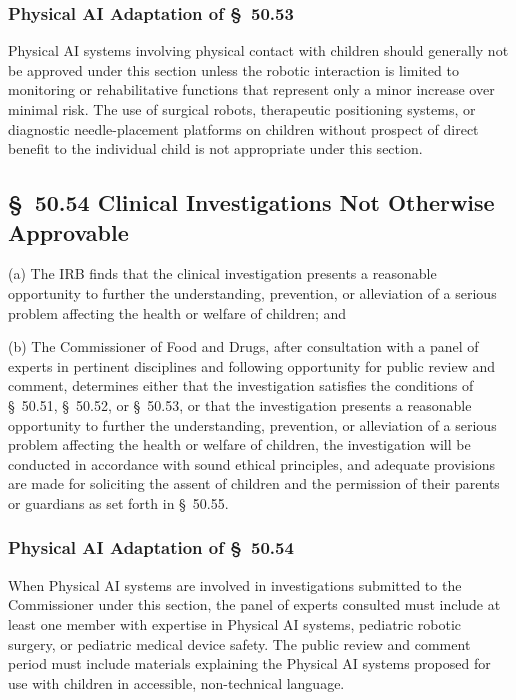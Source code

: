 \subsubsection{Physical AI Adaptation of \S~50.53}

Physical AI systems involving physical contact with children should generally not be approved under this section unless the robotic interaction is limited to monitoring or rehabilitative functions that represent only a minor increase over minimal risk. The use of surgical robots, therapeutic positioning systems, or diagnostic needle-placement platforms on children without prospect of direct benefit to the individual child is not appropriate under this section.

\subsection{\S~50.54 Clinical Investigations Not Otherwise Approvable}

(a) The IRB finds that the clinical investigation presents a reasonable opportunity to further the understanding, prevention, or alleviation of a serious problem affecting the health or welfare of children; and

(b) The Commissioner of Food and Drugs, after consultation with a panel of experts in pertinent disciplines and following opportunity for public review and comment, determines either that the investigation satisfies the conditions of \S~50.51, \S~50.52, or \S~50.53, or that the investigation presents a reasonable opportunity to further the understanding, prevention, or alleviation of a serious problem affecting the health or welfare of children, the investigation will be conducted in accordance with sound ethical principles, and adequate provisions are made for soliciting the assent of children and the permission of their parents or guardians as set forth in \S~50.55.

\subsubsection{Physical AI Adaptation of \S~50.54}

When Physical AI systems are involved in investigations submitted to the Commissioner under this section, the panel of experts consulted must include at least one member with expertise in Physical AI systems, pediatric robotic surgery, or pediatric medical device safety. The public review and comment period must include materials explaining the Physical AI systems proposed for use with children in accessible, non-technical language.

